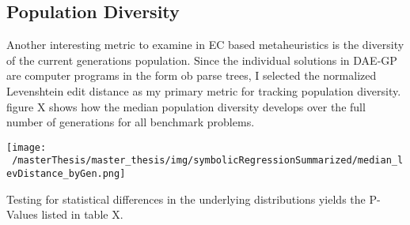\documentclass[
  11pt,
]{article}
\let\origfigure\figure
\let\endorigfigure\endfigure
\renewenvironment{figure}[1][2] {
    \expandafter\origfigure\expandafter[H]
} {
    \endorigfigure
}
\begin{document}
\hypertarget{population-diversity}{%
\subsection{Population Diversity}\label{population-diversity}}

Another interesting metric to examine in EC based metaheuristics is the diversity of the current generations population. Since the individual solutions in DAE-GP are computer programs in the form ob parse trees, I selected the normalized Levenshtein edit distance as my primary metric for tracking population diversity. figure X shows how the median population diversity develops over the full number of generations for all benchmark problems.

\begin{figure}
\centering
\texttt{[image: ~/masterThesis/master\_thesis/img/symbolicRegressionSummarized/median\_levDistance\_byGen.png]}
\caption{Median Population Diversity over Generations}
\end{figure}

Testing for statistical differences in the underlying distributions yields the P-Values listed in table X.
\end{document}
